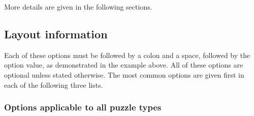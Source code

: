 \documentclass{article}
\begin{document}
More details are given in the following sections.

\subsection{Layout information}

Each of these options must be followed by a colon and a space,
followed by the option value, as demonstrated in the example above.
All of these options are optional unless stated otherwise.  The most
common options are given first in each of the following three lists.

\subsubsection*{Options applicable to all puzzle types}
\end{document}
